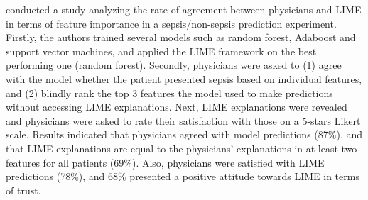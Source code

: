 

\cite{kumarakulasinghe2020evaluating} conducted a study analyzing the rate of agreement between physicians and LIME in terms of feature importance in a sepsis/non-sepsis prediction experiment. Firstly, the authors trained several models such as random forest, Adaboost and support vector machines, and applied the LIME framework on the best performing one (random forest). Secondly, physicians were asked to (1) agree with the model whether the patient presented sepsis based on individual features, and (2) blindly rank the top 3 features the model used to make predictions without accessing LIME explanations. Next, LIME explanations were revealed and physicians were asked to rate their satisfaction with those on a 5-stars Likert scale. Results indicated that physicians agreed with model predictions (87\%), and that LIME explanations are equal to the physicians' explanations in at least two features for all patients (69\%). Also, physicians were satisfied with LIME predictions (78\%), and 68\% presented a positive attitude towards LIME in terms of trust. 


